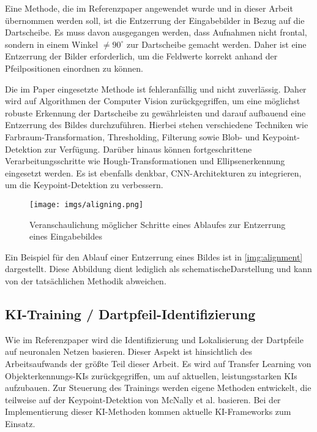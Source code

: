 Eine Methode, die im Referenzpaper angewendet wurde und in dieser Arbeit übernommen werden soll, ist die Entzerrung der Eingabebilder in Bezug auf die Dartscheibe. Es muss davon ausgegangen werden, dass Aufnahmen nicht frontal, sondern in einem Winkel $\neq90^\circ$ zur Dartscheibe gemacht werden. Daher ist eine Entzerrung der Bilder erforderlich, um die Feldwerte korrekt anhand der Pfeilpositionen einordnen zu können.

Die im Paper eingesetzte Methode ist fehleranfällig und nicht zuverlässig. Daher wird auf Algorithmen der Computer Vision zurückgegriffen, um eine möglichst robuste Erkennung der Dartscheibe zu gewährleisten und darauf aufbauend eine Entzerrung des Bildes durchzuführen. Hierbei stehen verschiedene Techniken wie Farbraum-Transformation, Thresholding, Filterung sowie Blob- und Keypoint-Detektion zur Verfügung. Darüber hinaus können fortgeschrittene Verarbeitungsschritte wie Hough-Transformationen und Ellipsenerkennung eingesetzt werden. Es ist ebenfalls denkbar, CNN-Architekturen zu integrieren, um die Keypoint-Detektion zu verbessern.

\begin{figure}
    \centering
    \texttt{[image: imgs/aligning.png]}
    \caption{Veranschaulichung möglicher Schritte eines Ablaufes zur Entzerrung eines Eingabebildes}
    \label{img:alignment}
\end{figure}

Ein Beispiel für den Ablauf einer Entzerrung eines Bildes ist in \autoref{img:alignment} dargestellt. Diese Abbildung dient lediglich als schematischeDarstellung und kann von der tatsächlichen Methodik abweichen.

\subsection{KI-Training / Dartpfeil-Identifizierung}
\label{sec:methodik:ki}

Wie im Referenzpaper wird die Identifizierung und Lokalisierung der Dartpfeile auf neuronalen Netzen basieren. Dieser Aspekt ist hinsichtlich des Arbeitsaufwands der größte Teil dieser Arbeit. Es wird auf Transfer Learning von Objekterkennungs-KIs zurückgegriffen, um auf aktuellen, leistungsstarken KIs aufzubauen. Zur Steuerung des Trainings werden eigene Methoden entwickelt, die teilweise auf der Keypoint-Detektion von McNally et al. basieren. Bei der Implementierung dieser KI-Methoden kommen aktuelle KI-Frameworks zum Einsatz.

